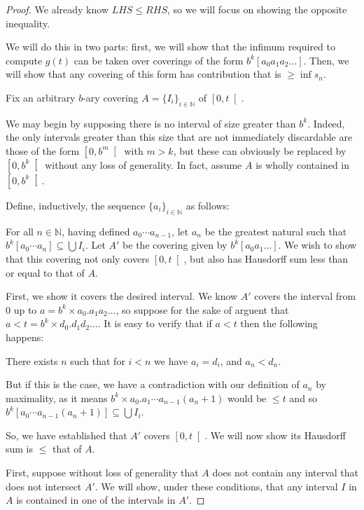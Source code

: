 \documentclass[11pt, reqno]{amsart}
\newcommand{\N}{\mathbb{N}}
\begin{document}
\begin{proof}
We already know $LHS \leq RHS$, so we will focus on showing the opposite inequality.

We will do this in two parts: first, we will show that the infimum required to compute $g(t)$ can be taken over coverings of the form $b^k [a_0 a_1 a_2 \dots]$. Then, we will show that any covering of this form has contribution that is $\geq \inf s_n$.

Fix an arbitrary $b$-ary covering $A = \{ I_i \}_{i \in \N}$ of $\left[ 0, t \right[$.

We may begin by supposing there is no interval of size greater than $b^k$. Indeed, the only intervals greater than this size that are not immediately discardable are those of the form $\left[0, b^m \right[$ with $m > k$, but these can obviously be replaced by $\left[0, b^k \right[$ without any loss of generality. In fact, assume $A$ is wholly contained in $\left[0, b^k \right[$.

Define, inductively, the sequence $\{a_i\}_{i \in \N}$ as follows:

For all $n \in \N$, having defined $a_0 \cdots a_{n-1}$, let $a_n$ be the greatest natural such that $b^k [a_0 \cdots a_n] \subseteq \bigcup I_i$. Let $A'$ be the covering given by $b^k [a_0 a_1 \dots]$. We wish to show that this covering not only covers $\left[0, t \right[$, but also has Hausdorff sum less than or equal to that of $A$.

First, we show it covers the desired interval. We know $A'$ covers the interval from 0 up to $a = b^k \times a_0 . a_1 a_2 \dots$, so suppose for the sake of arguent that $a < t = b^k \times d_0 . d_1 d_2 \dots$. It is easy to verify that if $a < t$ then the following happens:

There exists $n$ such that for $i < n$ we have $a_i = d_i$, and $a_n < d_n$.

But if this is the case, we have a contradiction with our definition of $a_n$ by maximality, as it means $b^k \times a_0 . a_1 \cdots a_{n-1} (a_n + 1)$ would be $\leq t$ and so $b^k [a_0 \cdots a_{n-1} (a_n + 1)] \subseteq \bigcup I_i$.

So, we have established that $A'$ covers $\left[0, t\right[$. We will now show its Hausdorff sum is $\leq$ that of $A$.

First, suppose without loss of generality that $A$ does not contain any interval that does not intersect $A'$. We will show, under these conditions, that any interval $I$ in $A$ is contained in one of the intervals in $A'$.


\end{proof}
\end{document}
